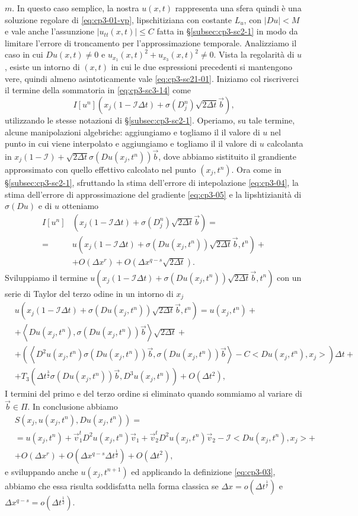 $m$. In questo caso semplice, la nostra $u(x,t)$ rappresenta una sfera
quindi è una soluzione regolare di \eqref{eq:cp3-01-vp},
lipschitiziana con costante $L_u$, con $|Du|<M$ e vale anche
l'assunzione $|u_{tt}(x,t)|\leq C$ fatta in §\ref{subsec:cp3-sc2-1} in modo
da limitare l'errore di troncamento per l'approssimazione
temporale. Analizziamo il caso in cui $Du(x,t)\ne 0$ e
$u_{x_1}(x,t)^2+u_{x_3}(x,t)^2\ne 0$. Vista la regolarità di $u$,
esiste un intorno di $(x,t)$ in cui le due espressioni precedenti si
mantengono vere, quindi almeno asintoticamente vale
\eqref{eq:cp3-sc21-01}.  Iniziamo col riscriverci il termine della
sommatoria in \eqref{eq:cp3-sc3-14} come
\[
I[u^n](x_j(1-\mathcal{I}\Delta t)+\sigma(D_j^n)\sqrt{2\Delta t}\vec{b}),
\]
utilizzando le stesse notazioni di §\ref{subsec:cp3-sc2-1}. Operiamo,
su tale termine, alcune manipolazioni algebriche: aggiungiamo e togliamo
il il valore di $u$ nel punto in cui viene interpolato e aggiungiamo e
togliamo il il valore di $u$ calcolanta in
$x_j(1-\mathcal{I})+\sqrt{2\Delta t}\sigma(Du(x_j,t^n))\vec{b}$, dove
abbiamo sistituito il grandiente approssimato con quello effettivo
calcolato nel punto $(x_j,t^n)$. Ora come in §\ref{subsec:cp3-sc2-1},
sfruttando la stima dell'errore di intepolazione \eqref{eq:cp3-04}, la
stima dell'errore di approssimazione del gradiente \eqref{eq:cp3-05} e
la lipshtizianità di $\sigma(Du)$ e di $u$ otteniamo
\[
\begin{split}
I[u^n]&(x_j(1-\mathcal{I}\Delta t)+\sigma(D_j^n)\sqrt{2\Delta
    t}\vec{b})=\\
=&u(x_j(1-\mathcal{I}\Delta t) +\sigma(Du(x_j,t^n))\sqrt{2\Delta t}\vec{b},t^n) +\\
&+O(\Delta x^r)+O(\Delta x^{q-s}\sqrt{2\Delta t}).
\end{split}
\]
Sviluppiamo il termine $u(x_j(1-\mathcal{I}\Delta t)
+\sigma(Du(x_j,t^n))\sqrt{2\Delta t}\vec{b},t^n)$ con un serie di
Taylor del terzo odine in un intorno di $x_j$
\[
\begin{split}
&u(x_j(1-\mathcal{I}\Delta t)+\sigma(Du(x_j,t^n))\sqrt{2\Delta t}\vec{b},t^n) = u(x_j,t^n)+ \\
&+\left<Du(x_j,t^n),\sigma(Du(x_j,t^n))\vec{b}\right>\sqrt{2\Delta t} +\\
&+\left(\left<D^2u(x_j,t^n)\sigma(Du(x_j,t^n))\vec{b},\sigma(Du(x_j,t^n))\vec{b}\right>-C<Du(x_j,t^n),x_j>\right)\Delta t + \\
&+T_3(\Delta t^{\frac{3}{2}}\sigma(Du(x_j,t^n))\vec{b},D^3u(x_j,t^n))+O(\Delta t^2), 
\end{split}
\]
I termini del primo e del terzo ordine
si eliminato quando sommiamo al variare di $\vec{b}\in\Pi$. In
conclusione abbiamo
\[
\begin{split}
& S(x_j,u(x_j,t^n),Du(x_j,t^n)) = \\
& = u(x_j,t^n) + \vec{v}_1^tD^2u(x_j,t^n)\vec{v}_1 + \vec{v}_2^tD^2u(x_j,t^n)\vec{v}_2 -\mathcal{I}<Du(x_j,t^n),x_j>+ \\
& + O(\Delta x^r) + O(\Delta x^{q-s}\Delta t^{\frac{1}{2}}) + O(\Delta t^2),
\end{split}
\]
e sviluppando anche $u(x_j,t^{n+1})$ ed applicando la definizione
\eqref{eq:cp3-03}, abbiamo che essa risulta soddisfatta nella forma
classica se $\Delta x = o(\Delta t^{\frac{1}{r}})$ e $\Delta x^{q-s}=o(\Delta t^{\frac{1}{2}})$.
